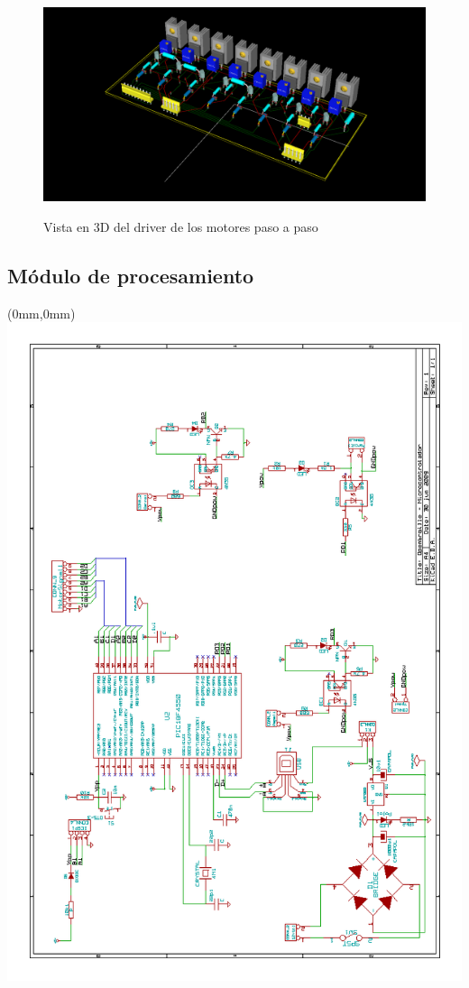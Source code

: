 \begin{figure}[hb]
  \centering
  \includegraphics[width=14cm]{./img/driver_3d_2.png}
  \label{fig:driver_3d_2}
  \caption{Vista en 3D del driver de los motores paso a paso}
\end{figure}


\subsection{M\'odulo de procesamiento}
\newpage
\begin{textblock*}{297mm}(0mm,0mm)
   \includegraphics[width=\paperwidth]{./img/pic_board.png}
   \label{cap:pic_board}
\end{textblock*}
\pagebreak
\cleardoublepage

